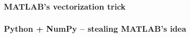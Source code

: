 \documentclass[
    xcolor={svgnames,dvipsnames},
    hyperref={colorlinks, citecolor=DeepPink4, linkcolor=DarkRed, urlcolor=DarkBlue}
    ]{beamer}  %
\newcommand{\1}{\mathbbm 1}
\begin{document}
\begin{frame}
    \frametitle{MATLAB's vectorization trick}
    
    \begin{figure}
       \begin{center} %
       \end{center}
    \end{figure}

    
\end{frame}


\begin{frame}
    \frametitle{Python + NumPy -- stealing MATLAB's idea}

    \begin{figure}
       \begin{center} %
       \end{center}
    \end{figure}


\end{frame}
\end{document}
